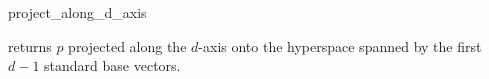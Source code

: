 \begin{ccRefFunction}{project_along_d_axis}

{returns $p$ projected along the $d$-axis onto the hyperspace
spanned by the first $d-1$ standard base vectors.}

\end{ccRefFunction}

